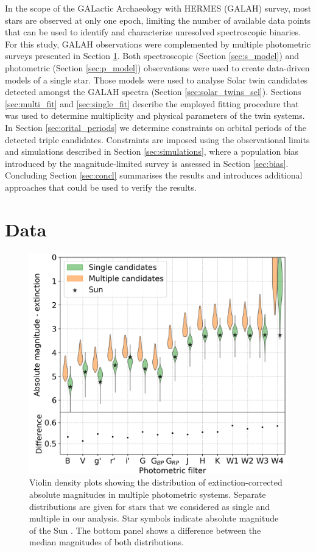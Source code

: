 In the scope of the GALactic Archaeology with HERMES (GALAH) survey, most stars are observed at only one epoch, limiting the number of available data points that can be used to identify and characterize unresolved spectroscopic binaries. For this study, GALAH observations were complemented by multiple photometric surveys presented in Section \ref{sec:data}. Both spectroscopic (Section \ref{sec:s_model}) and photometric (Section \ref{sec:p_model}) observations were used to create data-driven models of a single star. Those models were used to analyse Solar twin candidates detected amongst the GALAH spectra (Section \ref{sec:solar_twins_sel}). Sections \ref{sec:multi_fit} and \ref{sec:single_fit} describe the employed fitting procedure that was used to determine multiplicity and physical parameters of the twin systems. In Section \ref{sec:orital_periods} we determine constraints on orbital periods of the detected triple candidates. Constraints are imposed using the observational limits and simulations described in Section \ref{sec:simulations}, where a population bias introduced by the magnitude-limited survey is assessed in Section \ref{sec:bias}. Concluding Section \ref{sec:concl} summarises the results and introduces additional approaches that could be used to verify the results.

\section{Data}
\label{sec:data}

\begin{figure}
	\centering
	\includegraphics[width=\columnwidth]{multimagplotebvc307.png}
	\caption{Violin density plots showing the distribution of extinction-corrected absolute magnitudes in multiple photometric systems. Separate distributions are given for stars that we considered as single and multiple in our analysis. Star symbols indicate absolute magnitude of the Sun \citep{2018ApJS..236...47W}. The bottom panel shows a difference between the median magnitudes of both distributions.}
	\label{fig:viol_photometry}
\end{figure}

